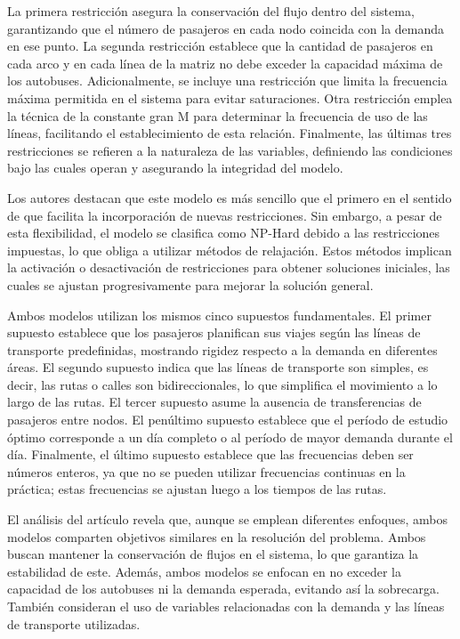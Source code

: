 \documentclass[preprint,11pt]{elsarticle}
\begin{document}
La primera restricción asegura la conservación del flujo dentro del sistema, garantizando que el número de pasajeros en cada nodo coincida con la demanda en ese punto. La segunda restricción establece que la cantidad de pasajeros en cada arco y en cada línea de la matriz no debe exceder la capacidad máxima de los autobuses. Adicionalmente, se incluye una restricción que limita la frecuencia máxima permitida en el sistema para evitar saturaciones. Otra restricción emplea la técnica de la constante gran M para determinar la frecuencia de uso de las líneas, facilitando el establecimiento de esta relación. Finalmente, las últimas tres restricciones se refieren a la naturaleza de las variables, definiendo las condiciones bajo las cuales operan y asegurando la integridad del modelo.

Los autores destacan que este modelo es más sencillo que el primero en el sentido de que facilita la incorporación de nuevas restricciones. Sin embargo, a pesar de esta flexibilidad, el modelo se clasifica como NP-Hard debido a las restricciones impuestas, lo que obliga a utilizar métodos de relajación. Estos métodos implican la activación o desactivación de restricciones para obtener soluciones iniciales, las cuales se ajustan progresivamente para mejorar la solución general.

Ambos modelos utilizan los mismos cinco supuestos fundamentales. El primer supuesto establece que los pasajeros planifican sus viajes según las líneas de transporte predefinidas, mostrando rigidez respecto a la demanda en diferentes áreas. El segundo supuesto indica que las líneas de transporte son simples, es decir, las rutas o calles son bidireccionales, lo que simplifica el movimiento a lo largo de las rutas. El tercer supuesto asume la ausencia de transferencias de pasajeros entre nodos. El penúltimo supuesto establece que el período de estudio óptimo corresponde a un día completo o al período de mayor demanda durante el día. Finalmente, el último supuesto establece que las frecuencias deben ser números enteros, ya que no se pueden utilizar frecuencias continuas en la práctica; estas frecuencias se ajustan luego a los tiempos de las rutas.

El análisis del artículo revela que, aunque se emplean diferentes enfoques, ambos modelos comparten objetivos similares en la resolución del problema. Ambos buscan mantener la conservación de flujos en el sistema, lo que garantiza la estabilidad de este. Además, ambos modelos se enfocan en no exceder la capacidad de los autobuses ni la demanda esperada, evitando así la sobrecarga. También consideran el uso de variables relacionadas con la demanda y las líneas de transporte utilizadas.
\end{document}
